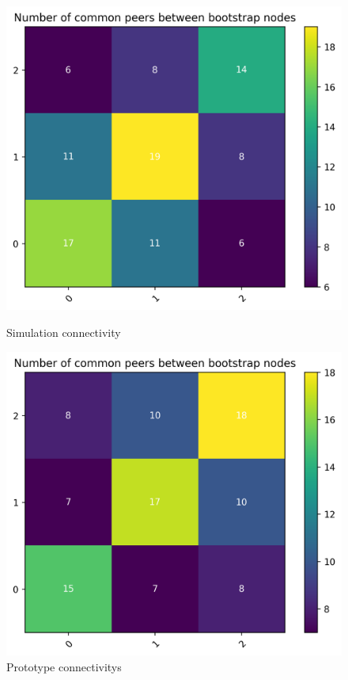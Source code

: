 \documentclass[mscthesis]{usiinfthesis}
\begin{document}
\begin{figure}[H]
   \begin{minipage}{0.49\textwidth}
     \centering
     \includegraphics[width=\linewidth]{images/5/5-connectivity.png}
  	\caption{Simulation connectivity}
  	\label{fig:sim-one-duplicates}
   \end{minipage}\hfill
   \begin{minipage}{0.49\textwidth}
     \centering
     \includegraphics[width=\linewidth]{images/6/6-connectivity.png}
       \caption{Prototype connectivitys}
 		\label{fig:sim-two-duplicates}
   \end{minipage}
\end{figure}
\end{document}

